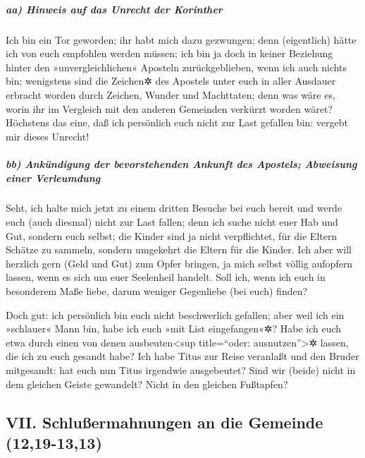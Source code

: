 \hypertarget{aa-hinweis-auf-das-unrecht-der-korinther}{%
\subparagraph{aa) Hinweis auf das Unrecht der
Korinther}\label{aa-hinweis-auf-das-unrecht-der-korinther}}

 Ich bin ein Tor geworden; ihr habt mich dazu gezwungen;
denn (eigentlich) hätte ich von euch empfohlen werden müssen; ich bin ja
doch in keiner Beziehung hinter den »unvergleichlichen« Aposteln
zurückgeblieben, wenn ich auch nichts bin;  wenigstens
sind die Zeichen✲ des Apostels unter euch in aller Ausdauer erbracht
worden durch Zeichen, Wunder und Machttaten;  denn was
wäre es, worin ihr im Vergleich mit den anderen Gemeinden verkürzt
worden wäret? Höchstens das eine, daß ich persönlich euch nicht zur Last
gefallen bin: vergebt mir dieses Unrecht!

\hypertarget{bb-ankuxfcndigung-der-bevorstehenden-ankunft-des-apostels-abweisung-einer-verleumdung}{%
\subparagraph{bb) Ankündigung der bevorstehenden Ankunft des Apostels;
Abweisung einer
Verleumdung}\label{bb-ankuxfcndigung-der-bevorstehenden-ankunft-des-apostels-abweisung-einer-verleumdung}}

 Seht, ich halte mich jetzt zu einem dritten Besuche bei
euch bereit und werde euch (auch diesmal) nicht zur Last fallen; denn
ich suche nicht euer Hab und Gut, sondern euch selbst; die Kinder sind
ja nicht verpflichtet, für die Eltern Schätze zu sammeln, sondern
umgekehrt die Eltern für die Kinder.  Ich aber will
herzlich gern (Geld und Gut) zum Opfer bringen, ja mich selbst völlig
aufopfern lassen, wenn es sich um euer Seelenheil handelt. Soll ich,
wenn ich euch in besonderem Maße liebe, darum weniger Gegenliebe (bei
euch) finden?

 Doch gut: ich persönlich bin euch nicht beschwerlich
gefallen; aber weil ich ein »schlauer« Mann bin, habe ich euch »mit List
eingefangen«✲?  Habe ich euch etwa durch einen von denen
ausbeuten\textless sup title=``oder: ausnutzen''\textgreater✲ lassen,
die ich zu euch gesandt habe?  Ich habe Titus zur Reise
veranlaßt und den Bruder mitgesandt: hat euch nun Titus irgendwie
ausgebeutet? Sind wir (beide) nicht in dem gleichen Geiste gewandelt?
Nicht in den gleichen Fußtapfen?

\hypertarget{vii.-schluuxdfermahnungen-an-die-gemeinde-1219-1313}{%
\subsection{VII. Schlußermahnungen an die Gemeinde
(12,19-13,13)}\label{vii.-schluuxdfermahnungen-an-die-gemeinde-1219-1313}}

